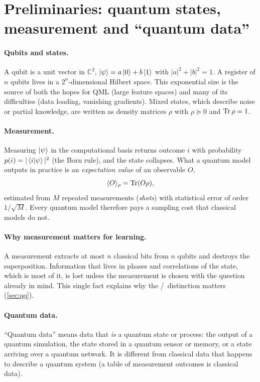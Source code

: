 \documentclass[11pt,a4paper]{article}
\begin{document}
\section{Preliminaries: quantum states, measurement and ``quantum data''}
\label{sec:prelim}

\paragraph{Qubits and states.}
A qubit is a unit vector in $\mathbb{C}^2$, $\ket{\psi}=a\ket{0}+b\ket{1}$ with $|a|^2+|b|^2=1$.
A register of $n$ qubits lives in a $2^n$-dimensional Hilbert space. This exponential size is the
source of both the hopes for QML (large feature spaces) and many of its difficulties (data loading,
vanishing gradients). Mixed states, which describe noise or partial knowledge, are written as density
matrices $\rho$ with $\rho\succeq0$ and $\operatorname{Tr}\rho=1$.

\paragraph{Measurement.}
Measuring $\ket{\psi}$ in the computational basis returns outcome $i$ with probability
$p(i)=|\braket{i|\psi}|^2$ (the Born rule), and the state collapses. What a quantum model outputs in
practice is an \emph{expectation value} of an observable $O$,
\begin{equation}
  \langle O\rangle_\rho=\operatorname{Tr}(O\rho),
\end{equation}
estimated from $M$ repeated measurements (\emph{shots}) with statistical error of order
$1/\sqrt{M}$. Every quantum model therefore pays a sampling cost that classical models do not.

\paragraph{Why measurement matters for learning.}
A measurement extracts at most $n$ classical bits from $n$ qubits and destroys the superposition.
Information that lives in phases and correlations of the state, which is most of it, is lost unless
the measurement is chosen with the question already in mind. This single fact explains why the
\QC/\QQ\ distinction matters (\cref{sec:qq}).

\paragraph{Quantum data.}
``Quantum data'' means data that \emph{is} a quantum state or process: the output of a quantum
simulation, the state stored in a quantum sensor or memory, or a state arriving over a quantum
network. It is different from classical data that happens to describe a quantum system (a table of
measurement outcomes is classical data).
\end{document}
